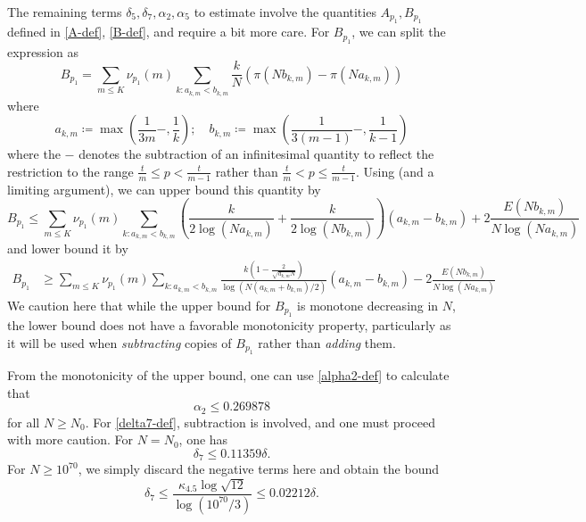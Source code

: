 \documentclass[10pt,a4paper,reqno]{amsart}
\numberwithin{equation}{section}
\theoremstyle{plain}
\theoremstyle{definition}
\begin{document}
The remaining terms $\delta_5, \delta_7, \alpha_2, \alpha_5$ to estimate involve the quantities $A_{p_1}, B_{p_1}$ defined in \eqref{A-def}, \eqref{B-def}, and require a bit more care.  For $B_{p_1}$, we can split the expression as
$$ B_{p_1} = \sum_{m \leq K} \nu_{p_1}(m) \sum_{k: a_{k,m} < b_{k,m}} \frac{k}{N} (\pi( N b_{k,m} ) - \pi(N a_{k,m}))$$
where
$$ a_{k,m} \coloneqq \max\left( \frac{1}{3m}-, \frac{1}{k} \right); \quad b_{k,m} \coloneqq \max\left( \frac{1}{3(m-1)}-, \frac{1}{k-1} \right)$$
where the $-$ denotes the subtraction of an infinitesimal quantity to reflect the restriction to the range $\frac{t}{m} \leq p < \frac{t}{m-1}$ rather than
$\frac{t}{m} < p \leq \frac{t}{m-1}$.  Using  (and a limiting argument), we can upper bound this quantity by
$$ B_{p_1} \leq \sum_{m \leq K} \nu_{p_1}(m) \sum_{k: a_{k,m} < b_{k,m}} \left(\frac{k}{2\log(N a_{k,m})}+\frac{k}{2\log(N b_{k,m})}\right) (a_{k,m}-b_{k,m}) + 2\frac{E(N b_{k,m})}{N \log(N a_{k,m})} $$
and lower bound it by
\begin{align*}
   B_{p_1} &\geq \sum_{m \leq K} \nu_{p_1}(m) \sum_{k: a_{k,m} < b_{k,m}} \frac{k\left(1-\frac{2}{\sqrt{a_{k,m} N}}\right)}{\log(N (a_{k,m}+b_{k,m})/2)}  (a_{k,m}-b_{k,m}) - 2\frac{E(N b_{k,m})}{N \log(N a_{k,m})}
\end{align*}
We caution here that while the upper bound for $B_{p_1}$ is monotone decreasing in $N$, the lower bound does not have a favorable monotonicity property, particularly as it will be used when \emph{subtracting} copies of $B_{p_1}$ rather than \emph{adding} them.

From the monotonicity of the upper bound, one can use \eqref{alpha2-def} to calculate that
$$ \alpha_2 \leq 0.269878$$
for all $N \geq N_0$.  For \eqref{delta7-def}, subtraction is involved, and one must proceed with more caution.  For $N=N_0$, one has
$$ \delta_7 \leq 0.11359 \delta.$$
For $N \geq 10^{70}$, we simply discard the negative terms here and obtain the bound
$$ \delta_7 \leq \frac{\kappa_{4.5} \log \sqrt{12}}{\log(10^{70}/3)}  \leq 0.02212 \delta.$$
\end{document}
